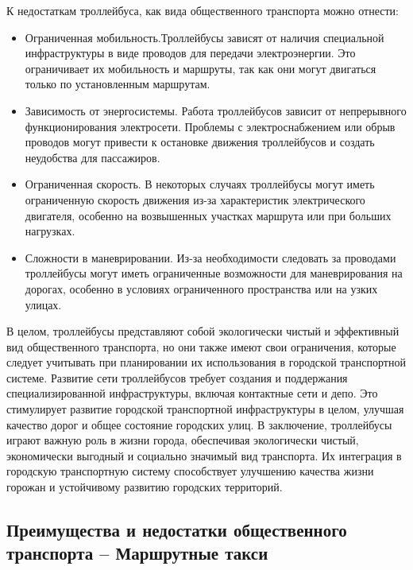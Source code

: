 К недостаткам троллейбуса, как вида общественного транспорта можно отнести:
\begin{itemize}
	\item Ограниченная мобильность.Троллейбусы зависят от наличия специальной инфраструктуры в виде проводов для передачи электроэнергии. Это ограничивает их мобильность и маршруты, так как они могут двигаться только по установленным маршрутам.
	\item Зависимость от энергосистемы. Работа троллейбусов зависит от непрерывного функционирования электросети. Проблемы с электроснабжением или обрыв проводов могут привести к остановке движения троллейбусов и создать неудобства для пассажиров.
	\item Ограниченная скорость. В некоторых случаях троллейбусы могут иметь ограниченную скорость движения из-за характеристик электрического двигателя, особенно на возвышенных участках маршрута или при больших нагрузках.
	\item Сложности в маневрировании. Из-за необходимости следовать за проводами троллейбусы могут иметь ограниченные возможности для маневрирования на дорогах, особенно в условиях ограниченного пространства или на узких улицах.
\end{itemize}

В целом, троллейбусы представляют собой экологически чистый и эффективный вид общественного транспорта, но они также имеют свои ограничения, которые следует учитывать при планировании их использования в городской транспортной системе. Развитие сети троллейбусов требует создания и поддержания специализированной инфраструктуры, включая контактные сети и депо. Это стимулирует развитие городской транспортной инфраструктуры в целом, улучшая качество дорог и общее состояние городских улиц. В заключение, троллейбусы играют важную роль в жизни города, обеспечивая экологически чистый, экономически выгодный и социально значимый вид транспорта. Их интеграция в городскую транспортную систему способствует улучшению качества жизни горожан и устойчивому развитию городских территорий.

\subsection{Преимущества и недостатки общественного транспорта -- Маршрутные такси}

